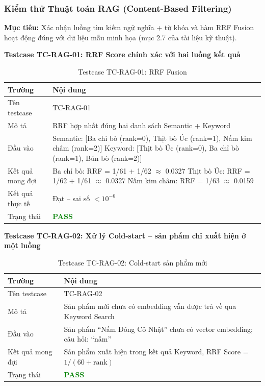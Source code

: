 \documentclass[12pt,a4paper]{report}
\begin{document}
\subsubsection{Kiểm thử Thuật toán RAG (Content-Based Filtering)}

\textbf{Mục tiêu:} Xác nhận luồng tìm kiếm ngữ nghĩa + từ khóa và hàm RRF Fusion hoạt động đúng với dữ liệu mẫu minh họa (mục 2.7 của tài liệu kỹ thuật).

\textbf{Testcase TC-RAG-01: RRF Score chính xác với hai luồng kết quả}

\begin{table}[htbp]
\centering
\renewcommand{\arraystretch}{1.3}
\begin{tabular}{|l|p{8cm}|}
\hline
\rowcolor[HTML]{EFEFEF}
\textbf{Trường} & \textbf{Nội dung} \\ \hline
Tên testcase & TC-RAG-01 \\ \hline
Mô tả & RRF hợp nhất đúng hai danh sách Semantic + Keyword \\ \hline
Đầu vào & Semantic: [Ba chỉ bò (rank=0), Thịt bò Úc (rank=1), Nấm kim châm (rank=2)] \newline Keyword: [Thịt bò Úc (rank=0), Ba chỉ bò (rank=1), Bún bò (rank=2)] \\ \hline
Kết quả mong đợi & Ba chỉ bò: RRF = 1/61 + 1/62 $\approx$ 0.0327 \newline Thịt bò Úc: RRF = 1/62 + 1/61 $\approx$ 0.0327 \newline Nấm kim châm: RRF = 1/63 $\approx$ 0.0159 \\ \hline
Kết quả thực tế & Đạt -- sai số $< 10^{-6}$ \\ \hline
Trạng thái & \textcolor{green}{\textbf{PASS}} \\ \hline
\end{tabular}
\caption{Testcase TC-RAG-01: RRF Fusion}
\end{table}

\textbf{Testcase TC-RAG-02: Xử lý Cold-start -- sản phẩm chỉ xuất hiện ở một luồng}

\begin{table}[htbp]
\centering
\renewcommand{\arraystretch}{1.3}
\begin{tabular}{|l|p{8cm}|}
\hline
\rowcolor[HTML]{EFEFEF}
\textbf{Trường} & \textbf{Nội dung} \\ \hline
Tên testcase & TC-RAG-02 \\ \hline
Mô tả & Sản phẩm mới chưa có embedding vẫn được trả về qua Keyword Search \\ \hline
Đầu vào & Sản phẩm ``Nấm Đông Cô Nhật'' chưa có vector embedding; câu hỏi: ``nấm'' \\ \hline
Kết quả mong đợi & Sản phẩm xuất hiện trong kết quả Keyword, RRF Score = $1/(60 + \text{rank})$ \\ \hline
Trạng thái & \textcolor{green}{\textbf{PASS}} \\ \hline
\end{tabular}
\caption{Testcase TC-RAG-02: Cold-start sản phẩm mới}
\end{table}
\end{document}
